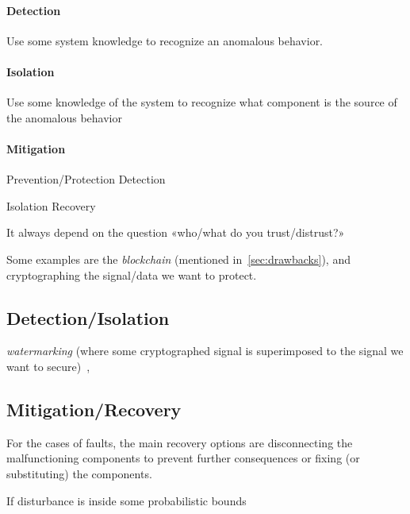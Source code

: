 \documentclass[../main.tex]{subfiles}
\begin{document}
\paragraph{Detection}
Use some system knowledge to recognize an anomalous behavior.

\paragraph{Isolation}
Use some  knowledge of the system to recognize what component is the source of the anomalous behavior

\paragraph{Mitigation}





Prevention/Protection
Detection

Isolation
Recovery

It always depend on the question «who/what do you trust/distrust?»

Some examples are the \emph{blockchain} (mentioned in~\ref{sec:drawbacks}), and cryptographing the signal/data we want to protect.

\subsection{Detection/Isolation}
\emph{watermarking} (where some cryptographed signal is superimposed to the signal we want to secure)~\cite{MoEtAl2015,SatchidanandanKumar2017,KshetriVoas2017,LuciaEtAl2021},
\cite{FortiEtAl2016}

\subsection{Mitigation/Recovery}
For the cases of faults, the main recovery options are disconnecting the malfunctioning components to prevent further consequences or fixing (or substituting) the components.

If disturbance is inside some probabilistic bounds \cite{AnandutaEtAl2020}


\end{document}
